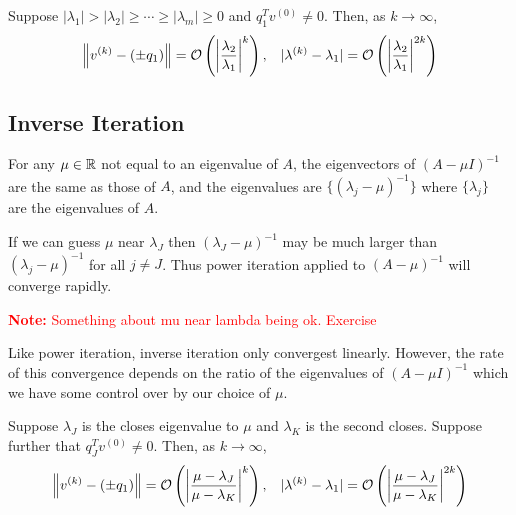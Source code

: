 \documentclass[12pt]{article}
\newcommand{\note}[1]{\textcolor{red}{\textbf{Note:} #1}}
\begin{document}
\begin{theorem}
Suppose \( |\lambda_1| > |\lambda_2| \geq \cdots \geq |\lambda_m| \geq 0 \) and \( q_1^Tv^{(0)} \neq 0 \). Then, as \( k\to\infty \),
\begin{align*}
    \left\lVert v^{(k)} - (\pm q_1) \right\rVert = \mathcal{O} \left( \left| \dfrac{\lambda_2}{\lambda_1} \right|^k \right), &&
    |\lambda^{(k)} - \lambda_1| = \mathcal{O} \left( \left| \dfrac{\lambda_2}{\lambda_1} \right|^{2k} \right)
\end{align*}
\end{theorem}

\subsection{Inverse Iteration}

For any \( \mu \in \mathbb{R} \) not equal to an eigenvalue of \( A \), the eigenvectors of \( (A-\mu I)^{-1} \) are the same as those of \( A \), and the eigenvalues are \( \{ (\lambda_j - \mu)^{-1} \} \) where \( \{\lambda_j\} \) are the eigenvalues of \( A \).

If we can guess \( \mu \) near \( \lambda_J \) then \( (\lambda_J - \mu)^{-1} \) may be much larger than \( (\lambda_j - \mu)^{-1} \) for all \( j\neq J \). Thus power iteration applied to \( (A-\mu)^{-1} \) will converge rapidly.

\begin{algorithm}
\begin{algorithmic}
\EndFor
\end{algorithmic}
\end{algorithm}

\note{Something about mu near lambda being ok. Exercise}

Like power iteration, inverse iteration only convergest linearly. However, the rate of this convergence depends on the ratio of the eigenvalues of \( (A-\mu I)^{-1} \) which we have some control over by our choice of \( \mu \).

\begin{theorem}
Suppose \( \lambda_J \) is the closes eigenvalue to \( \mu \) and \( \lambda_K \) is the second closes. Suppose further that \( q_J^T v^{(0)} \neq 0 \). Then, as \( k\to\infty \),
\begin{align*}
    \left\lVert v^{(k)} - (\pm q_1) \right\rVert = \mathcal{O} \left( \left| \dfrac{\mu - \lambda_J}{\mu - \lambda_K} \right|^k \right), &&
    |\lambda^{(k)} - \lambda_1| = \mathcal{O} \left( \left| \dfrac{\mu - \lambda_J}{\mu - \lambda_K} \right|^{2k} \right)
\end{align*}
\end{theorem}
\end{document}
